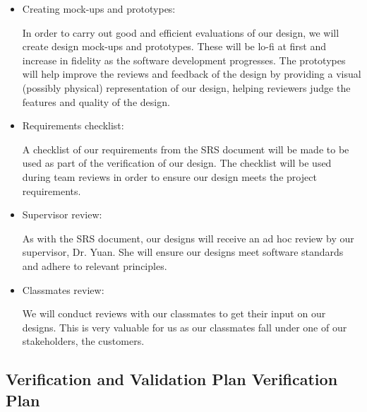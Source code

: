 \documentclass[12pt, titlepage]{article}
\begin{document}
\begin{itemize}
  \item Creating mock-ups and prototypes:

      In order to carry out good and efficient evaluations of our design, we will create design mock-ups and prototypes. These will be lo-fi at first and increase in fidelity as the software development progresses. The prototypes will help improve the reviews and feedback of the design by providing a visual (possibly physical) representation of our design, helping reviewers judge the features and quality of the design.
  
  \item Requirements checklist:

      A checklist of our requirements from the SRS document will be made to be used as part of the verification of our design. The checklist will be used during team reviews in order to ensure our design meets the project requirements.
  
  \item Supervisor review:

      As with the SRS document, our designs will receive an ad hoc review by our supervisor, Dr. Yuan. She will ensure our designs meet software standards and adhere to relevant principles.   

  \item Classmates review:

      We will conduct reviews with our classmates to get their input on our designs. This is very valuable for us as our classmates fall under one of our stakeholders, the customers.

\end{itemize}

\subsection{Verification and Validation Plan Verification Plan}
\end{document}
